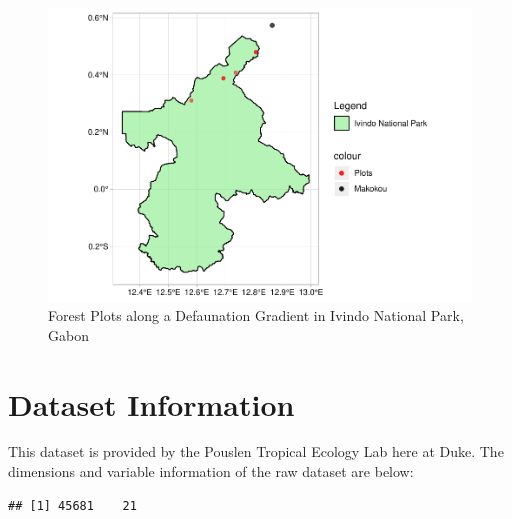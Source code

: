 \documentclass[
  12pt,
]{article}
\begin{document}
\begin{figure}
\centering
\includegraphics{GoldenGriffithsKnierMalinowski_ENV872_Project_files/figure-latex/Map of Ivindo with plots-1.pdf}
\caption{Forest Plots along a Defaunation Gradient in Ivindo National
Park, Gabon}
\end{figure}

\newpage

\hypertarget{dataset-information}{%
\section{Dataset Information}\label{dataset-information}}

This dataset is provided by the Pouslen Tropical Ecology Lab here at
Duke. The dimensions and variable information of the raw dataset are
below:

\begin{verbatim}
## [1] 45681    21
\end{verbatim}
\end{document}
